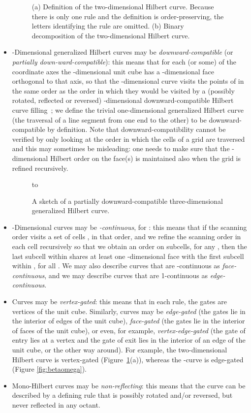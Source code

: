 \documentclass[11pt,a4paper]{article}
\begin{document}
\begin{itemize}
\begin{figure}
{}
\caption{(a) Definition of the two-dimensional Hilbert curve. Because there is only one rule and the definition is order-preserving, the letters identifying the rule are omitted. (b) Binary decomposition of the two-dimensional Hilbert curve.}
\label{fig:decomposable}\label{fig:vertexgated}
\end{figure}
\item -Dimensional generalized Hilbert curves may be \emph{downward-compatible} (or \emph{partially down-ward-compatible}): this means that for each (or some) of the  coordinate axes the -dimensional unit cube has a -dimensional face  orthogonal to that axis, so that the -dimensional curve visits the points of  in the same order as the order in which they would be visited by a (possibly rotated, reflected or reversed) -dimensional downward-compatible Hilbert curve filling~; we define the trivial one-dimensional generalized Hilbert curve (the traversal of a line segment from one end to the other) to be downward-compatible by definition.
    Note that downward-compatibility cannot be verified by only looking at the order in which the cells of a  grid are traversed and this may sometimes be misleading: one needs to make sure that the -dimensional Hilbert order on the face(s) is maintained also when the grid is refined recursively.
\begin{figure}
\centering
\hbox to 
\caption{A sketch of a partially downward-compatible three-dimensional generalized Hilbert curve.}
\label{fig:compatible}
\end{figure}
\item -Dimensional curves may be \emph{-continuous}, for : this means that if the scanning order visits a set of cells , in that order, and we refine the scanning order in each cell recursively so that we obtain an order on  subcells, for any , then the last subcell within  shares at least one -dimensional face with the first subcell within , for all . We may also describe curves that are -continuous as \emph{face-continuous}, and we may describe curves that are 1-continuous as \emph{edge-continuous}.
\item Curves may be \emph{vertex-gated}: this means that in each rule, the gates are vertices of the unit cube. Similarly, curves may be \emph{edge-gated} (the gates lie in the interior of edges of the unit cube), \emph{face-gated} (the gates lie in the interior of faces of the unit cube), or even, for example, \emph{vertex-edge-gated} (the gate of entry lies at a vertex and the gate of exit lies in the interior of an edge of the unit cube, or the other way around). For example, the two-dimensional Hilbert curve is vertex-gated (Figure~\ref{fig:vertexgated}(a)), whereas the -curve is edge-gated (Figure \ref{fig:betaomega}).
\item Mono-Hilbert curves may be \emph{non-reflecting}: this means that the curve can be described by a defining rule that is possibly rotated and/or reversed, but never reflected in any octant.
\end{itemize}
\end{document}
